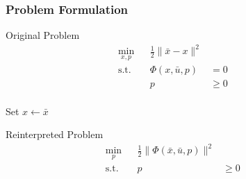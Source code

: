 %
%

\begin{frame}
    \frametitle{Problem Formulation}

    Original Problem
    \begin{align*}
        \min_{x,p} & & \frac{1}{2} \| \bar{x} - x \|^2 & & \\
        \operatorname{s.t.} & & \Phi(x,\bar{u},p) & = 0 & & \\
                            & & p & \geq 0 & & \\
    \end{align*}

    Set $x \leftarrow \bar{x}$

    Reinterpreted Problem
    \begin{align*}
        \min_{p}  & & \frac{1}{2} \| \Phi(\bar{x},\bar{u},p) \|^2 & & \\
        \operatorname{s.t.} & & p & \geq 0 & & \\
    \end{align*}
\end{frame}

